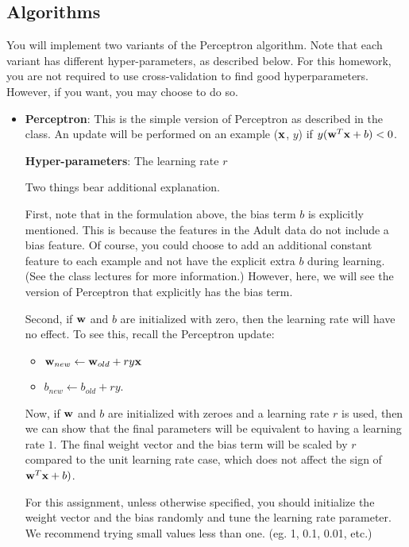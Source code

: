 \subsection{Algorithms}

You will implement two variants of the Perceptron algorithm. Note that
each variant has different hyper-parameters, as described below. For
this homework, you are not required to use cross-validation to find
good hyperparameters. However, if you want, you may choose to do so.

\begin{itemize}
\item {\bf Perceptron}: This is the simple version of Perceptron as
  described in the class. An update will be performed on an example
  (${\bf x}$, $y$) if $y ({\bf w}^T{\bf x} + b) < 0$.
  
  {\bf Hyper-parameters}: The learning rate $r$

  Two things bear additional explanation. 

  First, note that in the formulation above, the bias term $b$ is
  explicitly mentioned. This is because the features in the Adult data
  do not include a bias feature. Of course, you could choose to add an
  additional constant feature to each example and not have the
  explicit extra $b$ during learning. (See the class lectures for more
  information.) However, here, we will see the version of Perceptron
  that explicitly has the bias term.

  Second, if ${\bf w}$ and $b$ are initialized with zero, then the
  learning rate will have no effect. To see this, recall the
  Perceptron update: 

  \begin{itemize}
  \item[] ${\bf w}_{new} \leftarrow {\bf w}_{old} + r y {\bf x}$
  \item[] $b_{new} \leftarrow b_{old} + r y$.
  \end{itemize}

  Now, if ${\bf w}$ and $b$ are initialized with zeroes and a learning
  rate $r$ is used, then we can show that the final parameters will be
  equivalent to having a learning rate $1$. The final weight vector
  and the bias term will be scaled by $r$ compared to the unit
  learning rate case, which does not affect the sign of
  ${\bf w}^T{\bf x} + b)$.

  For this assignment, unless otherwise specified, you should
  initialize the weight vector and the bias randomly and tune the
  learning rate parameter. We recommend trying small values less than
  one. (eg. 1, 0.1, 0.01, etc.)


\end{itemize}

